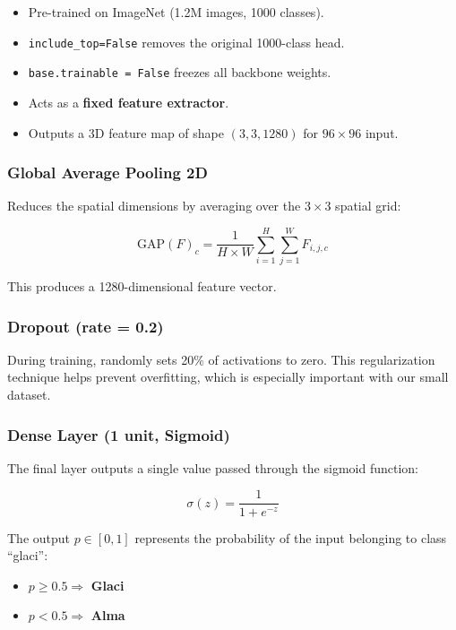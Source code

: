 \documentclass[12pt,a4paper]{article}
\begin{document}
\begin{itemize}
    \item Pre-trained on ImageNet (1.2M images, 1000 classes).
    \item \texttt{include\_top=False} removes the original 1000-class head.
    \item \texttt{base.trainable = False} freezes all backbone weights.
    \item Acts as a \textbf{fixed feature extractor}.
    \item Outputs a 3D feature map of shape $(3, 3, 1280)$ for $96 \times 96$ input.
\end{itemize}

\subsubsection{Global Average Pooling 2D}

Reduces the spatial dimensions by averaging over the $3 \times 3$ spatial grid:

$$\text{GAP}(F)_c = \frac{1}{H \times W} \sum_{i=1}^{H} \sum_{j=1}^{W} F_{i,j,c}$$

This produces a 1280-dimensional feature vector.

\subsubsection{Dropout (rate = 0.2)}

During training, randomly sets 20\% of activations to zero. This regularization technique helps prevent overfitting, which is especially important with our small dataset.

\subsubsection{Dense Layer (1 unit, Sigmoid)}

The final layer outputs a single value passed through the sigmoid function:

$$\sigma(z) = \frac{1}{1 + e^{-z}}$$

The output $p \in [0, 1]$ represents the probability of the input belonging to class ``glaci'':
\begin{itemize}
    \item $p \geq 0.5 \Rightarrow$ \textbf{Glaci}
    \item $p < 0.5 \Rightarrow$ \textbf{Alma}
\end{itemize}

\end{document}
